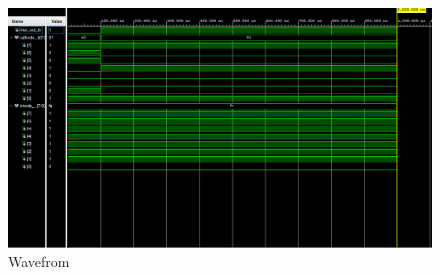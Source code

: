 \documentclass{article}
\begin{document}
\begin{figure}[h]
\begin{center}
\includegraphics[width=1\textwidth]{DisplayWaveForm.png} %
\caption{Wavefrom}
\end{center}
\end{figure}


\end{document}
